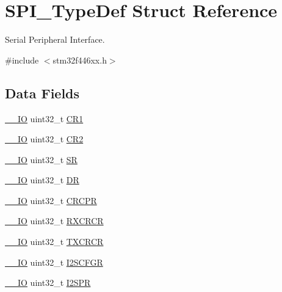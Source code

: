 \hypertarget{struct_s_p_i___type_def}{}\section{S\+P\+I\+\_\+\+Type\+Def Struct Reference}
\label{struct_s_p_i___type_def}


Serial Peripheral Interface.  




{\ttfamily \#include $<$stm32f446xx.\+h$>$}

\subsection*{Data Fields}
\begin{DoxyCompactItemize}
\item 
\mbox{\hyperlink{core__sc300_8h_aec43007d9998a0a0e01faede4133d6be}{\+\_\+\+\_\+\+IO}} uint32\+\_\+t \mbox{\hyperlink{struct_s_p_i___type_def_ab0ec7102960640751d44e92ddac994f0}{C\+R1}}
\item 
\mbox{\hyperlink{core__sc300_8h_aec43007d9998a0a0e01faede4133d6be}{\+\_\+\+\_\+\+IO}} uint32\+\_\+t \mbox{\hyperlink{struct_s_p_i___type_def_afdfa307571967afb1d97943e982b6586}{C\+R2}}
\item 
\mbox{\hyperlink{core__sc300_8h_aec43007d9998a0a0e01faede4133d6be}{\+\_\+\+\_\+\+IO}} uint32\+\_\+t \mbox{\hyperlink{struct_s_p_i___type_def_af6aca2bbd40c0fb6df7c3aebe224a360}{SR}}
\item 
\mbox{\hyperlink{core__sc300_8h_aec43007d9998a0a0e01faede4133d6be}{\+\_\+\+\_\+\+IO}} uint32\+\_\+t \mbox{\hyperlink{struct_s_p_i___type_def_a3df0d8dfcd1ec958659ffe21eb64fa94}{DR}}
\item 
\mbox{\hyperlink{core__sc300_8h_aec43007d9998a0a0e01faede4133d6be}{\+\_\+\+\_\+\+IO}} uint32\+\_\+t \mbox{\hyperlink{struct_s_p_i___type_def_ace450027b4b33f921dd8edd3425a717c}{C\+R\+C\+PR}}
\item 
\mbox{\hyperlink{core__sc300_8h_aec43007d9998a0a0e01faede4133d6be}{\+\_\+\+\_\+\+IO}} uint32\+\_\+t \mbox{\hyperlink{struct_s_p_i___type_def_a2cf9dcd9008924334f20f0dc6b57042e}{R\+X\+C\+R\+CR}}
\item 
\mbox{\hyperlink{core__sc300_8h_aec43007d9998a0a0e01faede4133d6be}{\+\_\+\+\_\+\+IO}} uint32\+\_\+t \mbox{\hyperlink{struct_s_p_i___type_def_ab4e4328504fd66285df8264d410deefd}{T\+X\+C\+R\+CR}}
\item 
\mbox{\hyperlink{core__sc300_8h_aec43007d9998a0a0e01faede4133d6be}{\+\_\+\+\_\+\+IO}} uint32\+\_\+t \mbox{\hyperlink{struct_s_p_i___type_def_aa0c41c8883cb0812d6aaf956c393584b}{I2\+S\+C\+F\+GR}}
\item 
\mbox{\hyperlink{core__sc300_8h_aec43007d9998a0a0e01faede4133d6be}{\+\_\+\+\_\+\+IO}} uint32\+\_\+t \mbox{\hyperlink{struct_s_p_i___type_def_ab9be89a916ee5904381e10da10e5e8e9}{I2\+S\+PR}}
\end{DoxyCompactItemize}


